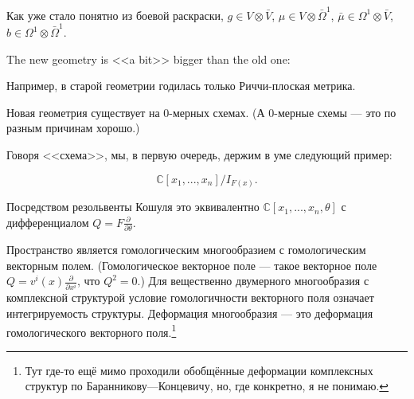 \documentclass[11pt]{article}
\theoremstyle{remark}
\theoremstyle{definition}
\newcommand{\que}[1]{\footnote{\textcolor[rgb]{0.38,0.69,0.82}{#1}}}
\begin{document}
Как уже стало понятно из боевой раскраски, $g \in V \otimes \bar V$, $\mu \in V \otimes \bar \Omega^1$, $\bar \mu \in \Omega^1 \otimes \bar V$, $b \in \Omega^1 \otimes \bar \Omega^1$.

The new geometry is <<a bit>> bigger than the old one:

\begin{center}
\end{center}

Например, в старой геометрии годилась только Риччи-плоская метрика.



Новая геометрия существует на 0-мерных схемах. (А 0-мерные схемы --- это по разным причинам хорошо.)



\footnotesize{}

Говоря <<схема>>, мы, в первую очередь, держим в уме следующий пример:

$$\mathbb{C}[x_1, ..., x_n] / I_{F(x)}.$$

Посредством резольвенты Кошуля это эквивалентно $\mathbb{C}[x_1, ..., x_n, \theta]$ с дифференциалом $Q = F \frac{\partial}{\partial \theta}.$


\normalsize{}


Пространство является гомологическим многообразием с гомологическим векторным полем. (Гомологическое векторное поле --- такое векторное поле $Q = v^i (x) \frac{\partial}{\partial x^i}$, что $Q^2 = 0$.) Для вещественно двумерного многообразия с комплексной структурой условие гомологичности векторного поля означает интегрируемость структуры. Деформация многообразия --- это деформация гомологического векторного поля.\que{Тут где-то ещё мимо проходили обобщённые деформации комплексных структур по Баранникову---Концевичу, но, где конкретно, я не понимаю.}
\end{document}
